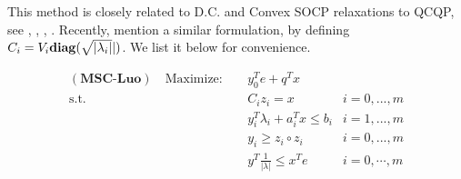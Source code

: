 \documentclass[../main]{subfiles}
\begin{document}
This method is closely related to D.C. and Convex SOCP relaxations to QCQP, see \cite{zheng_convex_2011}, \cite{zheng_nonconvex_2011}, \cite{jiang_simultaneous_2016}, \cite{ye_new_2003}. Recently, \cite{luo_new_2019} mention a similar formulation, by defining \(C_i = V_i\mathbf{diag}(\sqrt{|\lambda_i|}|)\). We list it below for convenience.

\begin{equation}
  \begin{aligned} \label{eq.rel.luo}
    (\textbf{MSC-Luo})\quad \mathrm{Maximize: }\quad & y_0 ^Te + q^Tx                                      \\
    \mathrm{s.t.} \quad                              & C_i z_i = x                        & i=0,...,m      \\
                                                     & y_i ^T\lambda_i  + a_i^Tx  \le b_i & i=1,...,m      \\
                                                     & y_i \ge z_i \circ z_i              & i=0,...,m      \\
                                                     & y^T\frac{1}{|\lambda|}  \le x^Te   & i=0, \cdots, m
  \end{aligned}
\end{equation}
\end{document}
